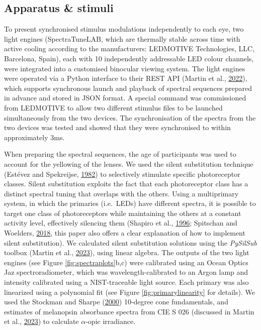 \documentclass[
]{article}
\begin{document}
\hypertarget{apparatus-stimuli}{%
\subsection{Apparatus \& stimuli}\label{apparatus-stimuli}}

To present synchronised stimulus modulations independently to each eye, two light engines (SpectraTuneLAB, which are thermally stable across time with active cooling according to the manufacturers: LEDMOTIVE Technologies, LLC, Barcelona, Spain), each with 10 independently addressable LED colour channels, were integrated into a customised binocular viewing system. The light engines were operated via a Python interface to their REST API (Martin et al., \protect\hyperlink{ref-Martin2022}{2022}), which supports synchronous launch and playback of spectral sequences prepared in advance and stored in JSON format. A special command was commissioned from LEDMOTIVE to allow two different stimulus files to be launched simultaneously from the two devices. The synchronisation of the spectra from the two devices was tested and showed that they were synchronised to within approximately 3ms.

When preparing the spectral sequences, the age of participants was used to account for the yellowing of the lenses. We used the silent substitution technique (Estévez and Spekreijse, \protect\hyperlink{ref-Estevez1982}{1982}) to selectively stimulate specific photoreceptor classes. Silent substitution exploits the fact that each photoreceptor class has a distinct spectral tuning that overlaps with the others. Using a multiprimary system, in which the primaries (i.e.~LEDs) have different spectra, it is possible to target one class of photoreceptors while maintaining the others at a constant activity level, effectively silencing them (Shapiro et al., \protect\hyperlink{ref-Shapiro1996}{1996}; Spitschan and Woelders, \protect\hyperlink{ref-Spitschan2018}{2018}, this paper also offers a clear explanation of how to implement silent substitution). We calculated silent substitution solutions using the \emph{PySilSub} toolbox (Martin et al., \protect\hyperlink{ref-Martin2023}{2023}), using linear algebra. The outputs of the two light engines (see Figure \ref{fig:spectraplots}b,c) were calibrated using an Ocean Optics Jaz spectroradiometer, which was wavelength-calibrated to an Argon lamp and intensity calibrated using a NIST-traceable light source. Each primary was also linearized using a polynomial fit (see Figure \ref{fig:primarylinearity} for details). We used the Stockman and Sharpe (\protect\hyperlink{ref-Stockman2000}{2000}) 10-degree cone fundamentals, and estimates of melanopsin absorbance spectra from CIE S 026 (discussed in Martin et al., \protect\hyperlink{ref-Martin2023}{2023}) to calculate \(\alpha\)-opic irradiance.
\end{document}

